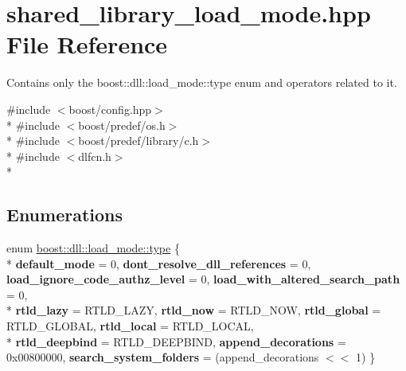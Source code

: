 \hypertarget{a00729}{}\section{shared\+\_\+library\+\_\+load\+\_\+mode.\+hpp File Reference}
\label{a00729}


Contains only the boost\+::dll\+::load\+\_\+mode\+::type enum and operators related to it.  


{\ttfamily \#include $<$boost/config.\+hpp$>$}\\*
{\ttfamily \#include $<$boost/predef/os.\+h$>$}\\*
{\ttfamily \#include $<$boost/predef/library/c.\+h$>$}\\*
{\ttfamily \#include $<$dlfcn.\+h$>$}\\*
\subsection*{Enumerations}
\begin{DoxyCompactItemize}
\item 
enum \hyperlink{a00729_a1918a602801479bc0bade54ff5665129}{boost\+::dll\+::load\+\_\+mode\+::type} \{ \\*
{\bfseries default\+\_\+mode} = 0, 
{\bfseries dont\+\_\+resolve\+\_\+dll\+\_\+references} = 0, 
{\bfseries load\+\_\+ignore\+\_\+code\+\_\+authz\+\_\+level} = 0, 
{\bfseries load\+\_\+with\+\_\+altered\+\_\+search\+\_\+path} = 0, 
\\*
{\bfseries rtld\+\_\+lazy} = R\+T\+L\+D\+\_\+\+L\+A\+ZY, 
{\bfseries rtld\+\_\+now} = R\+T\+L\+D\+\_\+\+N\+OW, 
{\bfseries rtld\+\_\+global} = R\+T\+L\+D\+\_\+\+G\+L\+O\+B\+AL, 
{\bfseries rtld\+\_\+local} = R\+T\+L\+D\+\_\+\+L\+O\+C\+AL, 
\\*
{\bfseries rtld\+\_\+deepbind} = R\+T\+L\+D\+\_\+\+D\+E\+E\+P\+B\+I\+ND, 
{\bfseries append\+\_\+decorations} = 0x00800000, 
{\bfseries search\+\_\+system\+\_\+folders} = (append\+\_\+decorations $<$$<$ 1)
 \}
\end{DoxyCompactItemize}

